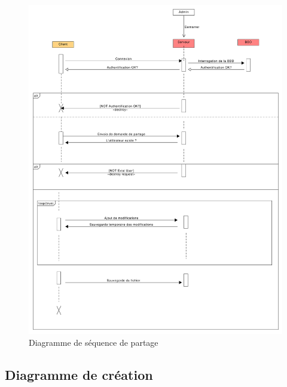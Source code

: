 	\begin{figure}[hb]
		\vspace*{1em}
		\centering
		\includegraphics[scale=.13]{setup/diagramme_sequence_partage.png}
		
		\caption{Diagramme de séquence de partage}
		\vspace*{1em}
	\end{figure}
	
	\newpage
	
	\subsection{Diagramme de création}
	
